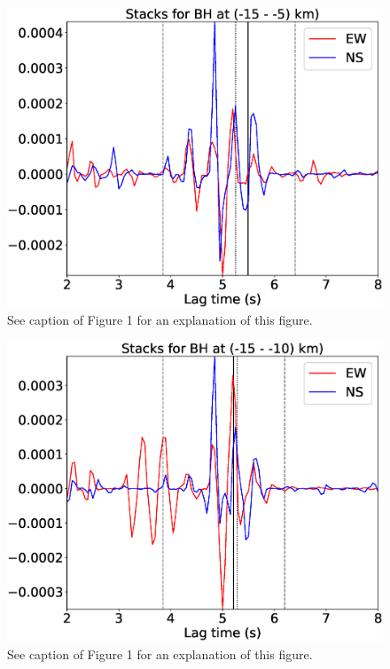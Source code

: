 \documentclass[letterpaper, 12pt]{article}
\begin{document}
\begin{figure}[H]
\includegraphics[width=\linewidth]{figures/intervals/BH_-15_-05_stacks.eps}
\caption{See caption of Figure 1 for an explanation of this figure.}
\end{figure}

\begin{figure}[H]
\includegraphics[width=\linewidth]{figures/intervals/BH_-15_-10_stacks.eps}
\caption{See caption of Figure 1 for an explanation of this figure.}
\end{figure}
\end{document}
